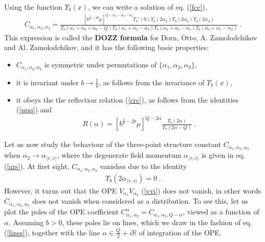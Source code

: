 \documentclass[12pt,a4paper,notitlepage]{report}
\newcommand \R {\mathbb{R}}
\numberwithin{equation}{section}
\theoremstyle{break}
\begin{document}
Using the function $\Upsilon_b(x)$, we can write a solution of eq. (\ref{fcc}),
\begin{align}
 \boxed{C_{\alpha_1,\alpha_2,\alpha_3} =  \frac{\left[b^{\frac{2}{b}-2b}\mu\right]^{Q-\alpha_1-\alpha_2-\alpha_3}\Upsilon_b'(0) \Upsilon_b(2\alpha_1) \Upsilon_b(2\alpha_2) \Upsilon_b(2\alpha_3)}{\Upsilon_b(\alpha_1+\alpha_2+\alpha_3-Q) \Upsilon_b(\alpha_1+\alpha_2-\alpha_3)\Upsilon_b(\alpha_2+\alpha_3-\alpha_1)\Upsilon_b(\alpha_3+\alpha_1-\alpha_2)}} \ .
\label{caaa}
\end{align}
This expression is called the \textbf{\boldmath DOZZ formula} for Dorn, Otto, A. Zamolodchikov and Al. Zamolodchikov, and it has the following basic properties:
\begin{itemize}
 \item $C_{\alpha_1,\alpha_2,\alpha_3}$ is symmetric under permutations of $\{\alpha_1,\alpha_2,\alpha_3\}$, 
\item it is invariant under $b\rightarrow \frac{1}{b}$, as follows from the invariance of $\Upsilon_b(x)$,
\item it obeys the the reflection relation (\ref{crc}), as follows from the identities (\ref{upq}) and 
\begin{align}
 R(\alpha)=\left[b^{\frac{2}{b}-2b}\mu\right]^{Q-2\alpha}\frac{\Upsilon_b(2\alpha)}{\Upsilon_b(2\alpha-Q)}\ .
\end{align}
\end{itemize}
Let us now study the behaviour of the three-point structure constant $C_{\alpha_1,\alpha_2,\alpha_3}$ when $\alpha_2 \rightarrow \alpha_{\langle r,s \rangle}$, where the degenerate field momentum $\alpha_{\langle r,s \rangle}$ is given in eq. (\ref{ars}). At first sight, $C_{\alpha_1,\alpha_2,\alpha_3}$ vanishes due to the identity 
\begin{align}
 \Upsilon_b(2\alpha_{\langle r,s \rangle})=0\ .
\label{ubt}
\end{align}
However, it turns out that the OPE $V_{\alpha_1}V_{\alpha_2}$ (\ref{vvi}) does not vanish, in other words $C_{\alpha_1,\alpha_2,\alpha_3}$ does not vanish when considered as a distribution. To see this, let us plot the poles of the OPE coefficient $C_{\alpha_1,\alpha_2}^\alpha = C_{\alpha_1,\alpha_2,Q-\alpha}$, viewed as a function of $\alpha$. Assuming $b>0$, these poles lie on lines, which we draw in the fashion of eq. (\ref{lines}), together with the line $\alpha\in \frac{Q}{2}+i\R$ of integration of the OPE, 
\end{document}
